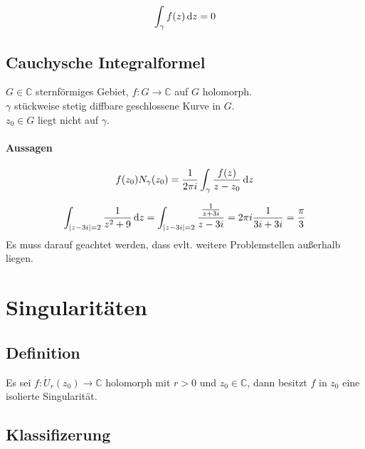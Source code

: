 \begin{equation}
    \int_\gamma f(z) \mathop{}\!\mathrm{d} z = 0
\end{equation}




\subsection{Cauchysche Integralformel}
\label{Cauchy_if}
$G \in \mathbb{C}$ sternförmiges Gebiet, $f: G \rightarrow \mathbb{C}$ auf $G$ holomorph.\\
$\gamma$ stückweise stetig diffbare geschlossene Kurve in $G$.\\
$z_0 \in G$ liegt nicht auf $\gamma$.

\paragraph{Aussagen}
\begin{equation}
    f(z_0) N_\gamma(z_0) = \frac{1}{2\pi i} \int_\gamma \frac{f(z)}{z-z_0}\mathop{}\!\mathrm{d} z
\end{equation}


\begin{equation*}
    \int_{|z-3i|=2}\frac{1}{z^2+9}\mathop{}\!\mathrm{d} z =  \int_{|z-3i|=2} \frac{\frac{1}{z+3i}}{z-3i}=2\pi i \frac{1}{3i+3i}=\frac{\pi}{3}
\end{equation*}
Es muss darauf geachtet werden, dass evlt. weitere Problemstellen außerhalb liegen.


\section{Singularitäten}

\subsection{Definition}
Es sei $f:\dot{U}_r(z_0) \to \mathbb{C}$ holomorph mit $r>0$ und $z_0\in \mathbb{C}$, dann besitzt $f$ in $z_0$ eine isolierte Singularität.

\subsection{Klassifizerung}
